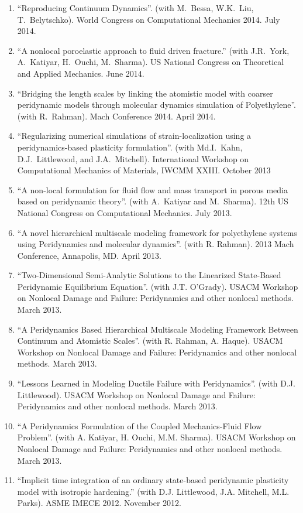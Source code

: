 \begin{etaremune}
\begin{enumerate}
    \item ``Reproducing Continuum Dynamics''. (with M.~Bessa, W.K.~Liu, T.~Belytschko). World Congress on Computational Mechanics 2014.  July 2014.
    \item ``A nonlocal poroelastic approach to fluid driven fracture.'' (with J.R.~York, A.~Katiyar, H.~Ouchi, M.~Sharma). US National Congress on Theoretical and Applied Mechanics.  June 2014.
    \item ``Bridging the length scales by linking the atomistic model with coarser peridynamic models through molecular dynamics simulation of Polyethylene''. (with R.~Rahman). Mach Conference 2014.  April 2014.
    \item ``Regularizing numerical simulations of strain-localization using a peridynamics-based plasticity formulation''. (with Md.I.~Kahn, D.J.~Littlewood, and J.A.~Mitchell). International Workshop on Computational Mechanics of Materials, IWCMM XXIII. October 2013
    \item ``A non-local formulation for fluid flow and mass transport in porous media based on peridynamic theory''. (with A.~Katiyar and M.~Sharma). 12th US National Congress on Computational Mechanics. July 2013.
    \item ``A novel hierarchical multiscale modeling framework for polyethylene systems using Peridynamics and molecular dynamics''. (with R. Rahman). 2013 Mach Conference, Annapolis, MD. April 2013. 
    \item ``Two-Dimensional Semi-Analytic Solutions to the Linearized State-Based Peridynamic Equilibrium Equation''. (with J.T. O'Grady). USACM Workshop on Nonlocal Damage and Failure: Peridynamics and other nonlocal methods. March 2013.
    \item ``A Peridynamics Based Hierarchical Multiscale Modeling Framework Between Continuum and Atomistic Scales''. (with R. Rahman, A. Haque). USACM Workshop on Nonlocal Damage and Failure: Peridynamics and other nonlocal methods. March 2013.
    \item ``Lessons Learned in Modeling Ductile Failure with Peridynamics''. (with D.J. Littlewood). USACM Workshop on Nonlocal Damage and Failure: Peridynamics and other nonlocal methods. March 2013.
    \item ``A Peridynamics Formulation of the Coupled Mechanics-Fluid Flow Problem''. (with A. Katiyar, H. Ouchi, M.M. Sharma). USACM Workshop on Nonlocal Damage and Failure: Peridynamics and other nonlocal methods. March 2013.
    \item ``Implicit time integration of an ordinary state-based peridynamic plasticity model with isotropic hardening.'' (with D.J. Littlewood, J.A. Mitchell, M.L. Parks).  ASME IMECE 2012.  November 2012.

\end{enumerate}
\end{etaremune}
